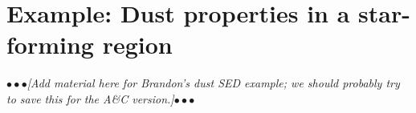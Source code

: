\documentclass[12pt]{article}
\numberwithin{equation}{section}
\numberwithin{figure}{section}
\numberwithin{table}{section}
\newcommand\enote[1]{{$\bullet\bullet\bullet$}{\sl [#1]}{$\bullet\bullet\bullet$}}
\begin{document}
\newpage {} %





\section{Example: Dust properties in a star-forming region}
\label{sec:dust}

\enote{Add material here for Brandon's dust SED example; we should probably try to save this for the A\&C version.}











\end{document}
